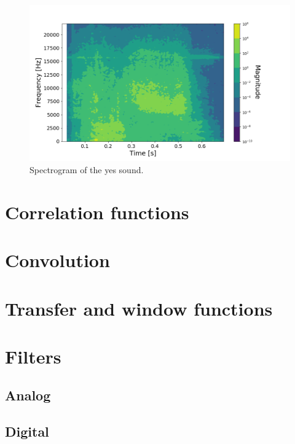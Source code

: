 \documentclass[12pt]{article}
\theoremstyle{plain}
\begin{document}
\begin{figure}[h!]
    \centering
	\includegraphics[width=.9\linewidth]{media/yes_sound_spectrogram.png}
	\caption{Spectrogram of the yes sound.}
	\label{spectrogram_2}
\end{figure}




\section{Correlation functions}



\section{Convolution}


\section{Transfer and window functions}


\section{Filters}


\subsection{Analog}


\subsection{Digital}
\end{document}
